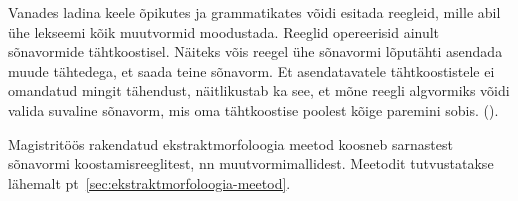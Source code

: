 \documentclass[12pt,a4paper]{article}
\begin{document}
Vanades ladina keele õpikutes ja grammatikates võidi esitada reegleid, mille abil ühe lekseemi kõik muutvormid moodustada. Reeglid opereerisid ainult sõnavormide tähtkoostisel. Näiteks võis reegel ühe sõnavormi lõputähti asendada muude tähtedega, et saada teine sõnavorm. Et asendatavatele tähtkoostistele ei omandatud mingit tähendust, näitlikustab ka see, et mõne reegli algvormiks võidi valida suvaline sõnavorm, mis oma tähtkoostise poolest kõige paremini sobis. (\cite[195-196]{matthews_morphology_1991}).


Magistritöös rakendatud ekstrakt\-morfoloogia meetod koosneb sarnastest sõna\-vormi koostamis\-reeglitest, nn muutvormi\-mallidest. Meetodit tutvustatakse lähemalt pt~\ref{sec:ekstraktmorfoloogia-meetod}.




\end{document}
